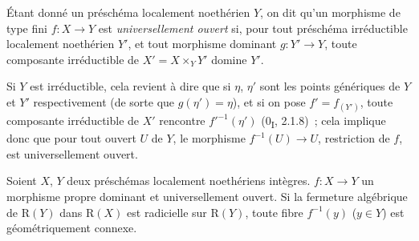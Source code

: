 \begin{definition}[4.3.9]
\label{III.4.3.9-fr}
Étant donné un préschéma localement noethérien $Y$, on dit qu'un morphisme de
type fini $f:X\to Y$ est \emph{universellement ouvert} si, pour tout
préschéma irréductible localement noethérien $Y'$, et tout morphisme dominant
$g:Y'\to Y$, toute composante irréductible de $X'=X\times_YY'$ domine $Y'$.
\end{definition}

Si $Y$ est irréductible, cela revient à dire que si $\eta$, $\eta'$ sont les
points génériques de $Y$ et $Y'$ respectivement (de sorte que
$g(\eta')=\eta$), et si on pose $f'=f_{(Y')}$, toute composante irréductible
de $X'$ rencontre $f'^{-1}(\eta')$ (0\textsubscript{I}, 2.1.8)~; cela
implique donc que pour tout ouvert $U$ de $Y$, le morphisme
$f^{-1}(U)\to U$, restriction de $f$, est universellement ouvert.

\begin{corollary}[4.3.10]
\label{III.4.3.10-fr}
Soient $X$, $Y$ deux préschémas localement noethériens intègres.
$f:X\to Y$ un morphisme propre dominant et universellement ouvert. Si la
fermeture algébrique de $\mathrm R(Y)$ dans $\mathrm R(X)$ est radicielle
sur $\mathrm R(Y)$, toute fibre $f^{-1}(y)$ ($y\in Y$) est géométriquement
connexe.
\end{corollary}

